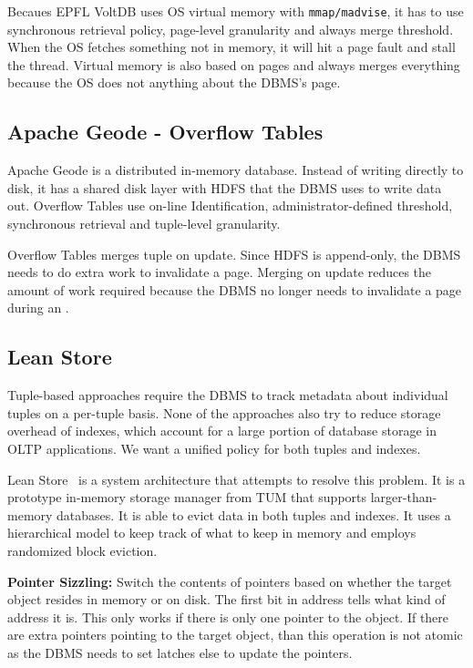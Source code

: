\documentclass[11pt]{article}
\begin{document}
Becaues EPFL VoltDB uses OS virtual memory with \texttt{mmap/madvise}, it has to use synchronous retrieval policy, page-level granularity and always merge threshold. When the OS fetches something not in memory, it will hit a page fault and stall the thread. Virtual memory is also based on pages and always merges everything because the OS does not anything about the DBMS's page.

\subsection*{Apache Geode - Overflow Tables}
Apache Geode is a distributed in-memory database. Instead of writing directly to disk, it has a shared disk layer with HDFS that the DBMS uses to write data out. Overflow Tables use on-line Identification, administrator-defined threshold, synchronous retrieval and tuple-level granularity.

Overflow Tables merges tuple on update. Since HDFS is append-only, the DBMS needs to do extra work to invalidate a page. Merging on update reduces the amount of work required because the DBMS no longer needs to invalidate a page during an .
\subsection*{Lean Store}
Tuple-based approaches require the DBMS to track metadata about individual tuples on a per-tuple basis. None of the approaches also try to reduce storage overhead of indexes, which account for a large portion of database storage in OLTP applications. We want a unified policy for both tuples and indexes.

Lean Store~\cite{8509247} is a system architecture that attempts to resolve this problem. It is a prototype in-memory storage manager from TUM that supports larger-than-memory databases. It is able to evict data in both tuples and indexes. It uses a hierarchical model to keep track of what to keep in memory and employs randomized block eviction.

\textbf{Pointer Sizzling:} Switch the contents of pointers based on whether the target object resides in memory or on disk. The first bit in address tells what kind of address it is. This only works if there is only one pointer to the object. If there are extra pointers pointing to the target object, than this operation is not atomic as the DBMS needs to set latches else to update the pointers.
\end{document}
